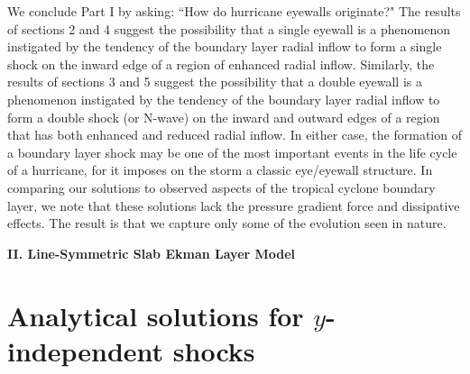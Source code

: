 \documentclass[10pt]{article}
\begin{document}
     We conclude Part I by asking: ``How do hurricane eyewalls originate?"
The results of sections 2 and 4 suggest the possibility that a single eyewall
is a phenomenon instigated by the tendency of the boundary layer radial
inflow to form a single shock on the inward edge of a region of enhanced
radial inflow. Similarly, the results of sections 3 and 5 suggest the possibility
that a double eyewall is a phenomenon instigated by the tendency of the
boundary layer radial inflow to form a double shock (or N-wave) on the
inward and outward edges of a region that has both enhanced and reduced
radial inflow. In either case, the formation of a boundary layer shock may
be one of the most important events in the life cycle of a hurricane, for
it imposes on the storm a classic eye/eyewall structure. In comparing our
solutions to observed aspects of the tropical cyclone boundary layer, we note
that these solutions lack the pressure gradient force and dissipative effects.
The result is that we capture only some of the evolution seen in nature.


\bigskip

\centerline{\bf II. Line-Symmetric Slab Ekman Layer Model}


\section{Analytical solutions for $y$-independent shocks} %
\end{document}
